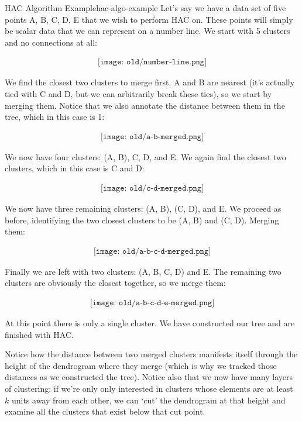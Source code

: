 \begin{example}{HAC Algorithm Example}{hac-algo-example}
Let's say we have a data set of five points A, B, C, D, E that we wish to perform HAC on. These points will simply be scalar data that we can represent on a number line. We start with 5 clusters and no connections at all:

\begin{align*}
	\texttt{[image: old/number-line.png]}
\end{align*}

We find the closest two clusters to merge first. A and B are nearest (it's actually tied with C and D, but we can arbitrarily break these ties), so we start by merging them. Notice that we also annotate the distance between them in the tree, which in this case is 1:

\begin{align*}
	\texttt{[image: old/a-b-merged.png]}
\end{align*}

We now have four clusters: (A, B), C, D, and E. We again find the closest two clusters, which in this case is C and D:

\begin{align*}
	\texttt{[image: old/c-d-merged.png]}
\end{align*}

We now have three remaining clusters: (A, B), (C, D), and E. We proceed as before, identifying the two closest clusters to be (A, B) and (C, D). Merging them:

\begin{align*}
	\texttt{[image: old/a-b-c-d-merged.png]}
\end{align*}

Finally we are left with two clusters: (A, B, C, D) and E. The remaining two clusters are obviously the closest together, so we merge them:

\begin{align*}
	\texttt{[image: old/a-b-c-d-e-merged.png]}
\end{align*}

At this point there is only a single cluster. We have constructed our tree and are finished with HAC.
\end{example}

Notice how the distance between two merged clusters manifests itself through the height of the dendrogram where they merge (which is why we tracked those distances as we constructed the tree). Notice also that we now have many layers of clustering: if we're only only interested in clusters whose elements are at least $k$ units away from each other, we can `cut' the dendrogram at that height and examine all the clusters that exist below that cut point.


